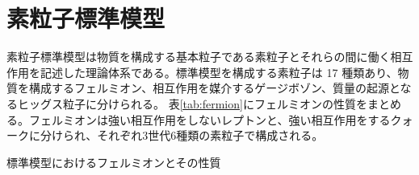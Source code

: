 \section{素粒子標準模型}
\label{sec_intro_sm}
素粒子標準模型は物質を構成する基本粒子である素粒子とそれらの間に働く相互作用を記述した理論体系である。標準模型を構成する素粒子は 17 種類あり、物質を構成するフェルミオン、相互作用を媒介するゲージボゾン、質量の起源となるヒッグス粒子に分けられる。
表\ref{tab:fermion}にフェルミオンの性質をまとめる。フェルミオンは強い相互作用をしないレプトンと、強い相互作用をするクォークに分けられ、それぞれ3世代6種類の素粒子で構成される。
\begin{table}[]
    \centering
    \caption[標準模型のフェルミオン]{標準模型におけるフェルミオンとその性質\cite{PDG2020}}
    \label{tab:fermion}


\end{table}

